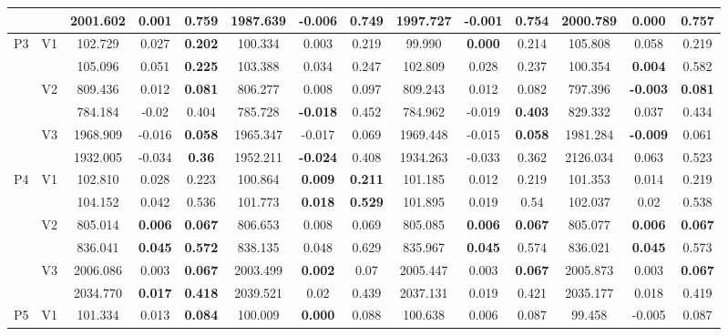 \documentclass[12pt,a4paper]{article}
\begin{document}
\begin{sidewaystable}[ht]
{\begin{tabular}{cc|ccc|ccc|ccc|ccc|}
   &  & 2001.602 & 0.001 & 0.759 & 1987.639 & -0.006 & \textbf{0.749} & 1997.727 & -0.001 & 0.754 & 2000.789 & \textbf{0.000} & 0.757 \\ 
   \hline \hline\multirow{6}{*}{P3} & \multirow{2}{*}{V1} & 102.729 & 0.027 & \textbf{0.202} & 100.334 & 0.003 & 0.219 & 99.990 & \textbf{0.000} & 0.214 & 105.808 & 0.058 & 0.219 \\ 
   &  & 105.096 & 0.051 & \textbf{0.225} & 103.388 & 0.034 & 0.247 & 102.809 & 0.028 & 0.237 & 100.354 & \textbf{0.004} & 0.582 \\ 
   & \multirow{2}{*}{V2} & 809.436 & 0.012 & \textbf{0.081} & 806.277 & 0.008 & 0.097 & 809.243 & 0.012 & 0.082 & 797.396 & \textbf{-0.003} & \textbf{0.081} \\ 
   &  & 784.184 & -0.02 & 0.404 & 785.728 & \textbf{-0.018} & 0.452 & 784.962 & -0.019 & \textbf{0.403} & 829.332 & 0.037 & 0.434 \\ 
   & \multirow{2}{*}{V3} & 1968.909 & -0.016 & \textbf{0.058} & 1965.347 & -0.017 & 0.069 & 1969.448 & -0.015 & \textbf{0.058} & 1981.284 & \textbf{-0.009} & 0.061 \\ 
   &  & 1932.005 & -0.034 & \textbf{0.36} & 1952.211 & \textbf{-0.024} & 0.408 & 1934.263 & -0.033 & 0.362 & 2126.034 & 0.063 & 0.523 \\ 
   \hline \hline\multirow{6}{*}{P4} & \multirow{2}{*}{V1} & 102.810 & 0.028 & 0.223 & 100.864 & \textbf{0.009} & \textbf{0.211} & 101.185 & 0.012 & 0.219 & 101.353 & 0.014 & 0.219 \\ 
   &  & 104.152 & 0.042 & 0.536 & 101.773 & \textbf{0.018} & \textbf{0.529} & 101.895 & 0.019 & 0.54 & 102.037 & 0.02 & 0.538 \\ 
   & \multirow{2}{*}{V2} & 805.014 & \textbf{0.006} & \textbf{0.067} & 806.653 & 0.008 & 0.069 & 805.085 & \textbf{0.006} & \textbf{0.067} & 805.077 & \textbf{0.006} & \textbf{0.067} \\ 
   &  & 836.041 & \textbf{0.045} & \textbf{0.572} & 838.135 & 0.048 & 0.629 & 835.967 & \textbf{0.045} & 0.574 & 836.021 & \textbf{0.045} & 0.573 \\ 
   & \multirow{2}{*}{V3} & 2006.086 & 0.003 & \textbf{0.067} & 2003.499 & \textbf{0.002} & 0.07 & 2005.447 & 0.003 & \textbf{0.067} & 2005.873 & 0.003 & \textbf{0.067} \\ 
   &  & 2034.770 & \textbf{0.017} & \textbf{0.418} & 2039.521 & 0.02 & 0.439 & 2037.131 & 0.019 & 0.421 & 2035.177 & 0.018 & 0.419 \\ 
   \hline \hline\multirow{6}{*}{P5} & \multirow{2}{*}{V1} & 101.334 & 0.013 & \textbf{0.084} & 100.009 & \textbf{0.000} & 0.088 & 100.638 & 0.006 & 0.087 & 99.458 & -0.005 & 0.087 \\ 

\end{tabular}}
\end{sidewaystable}
\end{document}
